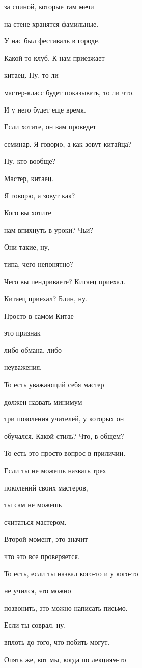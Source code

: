 за спиной, которые там мечи

на стене хранятся фамильные.

У нас был фестиваль в городе.

Какой-то клуб. К нам приезжает

китаец. Ну, то ли

мастер-класс будет показывать, то ли что.

И у него будет еще время.

Если хотите, он вам проведет

семинар. Я говорю, а как зовут китайца?

Ну, кто вообще?

Мастер, китаец.

Я говорю, а зовут как?

Кого вы хотите

нам впихнуть в уроки? Чьи?

Они такие, ну,

типа, чего непонятно?

Чего вы пендриваете? Китаец приехал.

Китаец приехал? Блин, ну.

Просто в самом Китае

это признак

либо обмана, либо

неуважения.

То есть уважающий себя мастер

должен назвать минимум

три поколения учителей, у которых он

обучался. Какой стиль? Что, в общем?

То есть это просто вопрос в приличии.

Если ты не можешь назвать трех

поколений своих мастеров,

ты сам не можешь

считаться мастером.

Второй момент, это значит

что это все проверяется.

То есть, если ты назвал кого-то и у кого-то

не учился, это можно

позвонить, это можно написать письмо.

Если ты соврал, ну,

вплоть до того, что побить могут.

Опять же, вот мы, когда по лекциям-то

